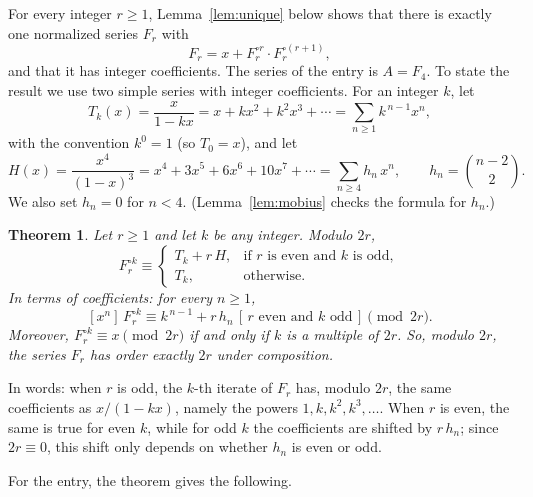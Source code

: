 \documentclass[11pt,a4paper]{article}
\newtheorem{theorem}{Theorem}[section]
\theoremstyle{definition}
\theoremstyle{remark}
\newcommand{\coeff}[2]{[x^{#1}]\,#2}
\begin{document}
For every integer $r\ge1$, Lemma~\ref{lem:unique} below shows that there is exactly one normalized series $F_r$ with
\begin{equation}\label{eq:family}
F_r=x+F_r^{\circ r}\cdot F_r^{\circ(r+1)},
\end{equation}
and that it has integer coefficients. The series of the entry is $A=F_{4}$. To state the result we use
two simple series with integer coefficients. For an integer $k$, let
\[
T_k(x)=\frac{x}{1-kx}=x+kx^2+k^2x^3+\cdots=\sum_{n\ge1}k^{\,n-1}x^n ,
\]
with the convention $k^0=1$ (so $T_0=x$), and let
\[
H(x)=\frac{x^4}{(1-x)^3}=x^4+3x^5+6x^6+10x^7+\cdots=\sum_{n\ge4}h_n\,x^n,\qquad h_n=\binom{n-2}{2}.
\]
We also set $h_n=0$ for $n<4$. (Lemma~\ref{lem:mobius} checks the formula for $h_n$.)

\begin{theorem}\label{thm:general}
Let $r\ge1$ and let $k$ be any integer. Modulo $2r$,
\[
F_r^{\circ k}\equiv
\begin{cases}
T_k+r\,H, & \text{if $r$ is even and $k$ is odd},\\
T_k, & \text{otherwise}.
\end{cases}
\]
In terms of coefficients: for every $n\ge1$,
\[
\coeff{n}{F_r^{\circ k}}\equiv k^{\,n-1}+r\,h_n\,[\,r\text{ even and }k\text{ odd}\,]\pmod{2r}.
\]
Moreover, $F_r^{\circ k}\equiv x\pmod{2r}$ if and only if $k$ is a multiple of $2r$. So, modulo $2r$, the series $F_r$
has order exactly $2r$ under composition.
\end{theorem}

In words: when $r$ is odd, the $k$-th iterate of $F_r$ has, modulo $2r$, the same coefficients as $x/(1-kx)$,
namely the powers $1,k,k^2,k^3,\dots$. When $r$ is even, the same is true for even $k$, while for odd $k$ the
coefficients are shifted by $r\,h_n$; since $2r\equiv0$, this shift only depends on whether $h_n$ is even or odd.

For the entry, the theorem gives the following.
\end{document}
